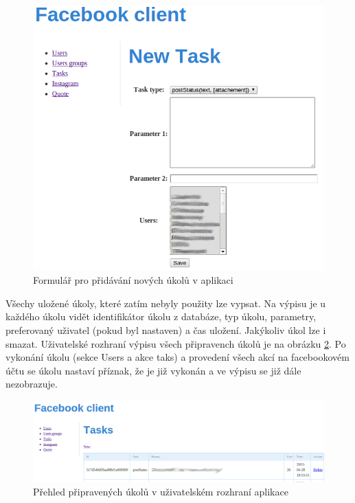 \documentclass[thesis=M,czech]{FITthesis}[2013/05/10]
\begin{document}
\begin{figure}[h]
\begin{center}
\includegraphics[width=5in]{figures/fcNewTask.png}
\caption{Formulář pro přidávání nových úkolů v aplikaci}
\label{fig:fcNewTask}
\end{center}
\end{figure}

Všechy uložené úkoly, které zatím nebyly použity lze vypsat. Na výpisu je u každého úkolu vidět identifikátor úkolu z databáze, typ úkolu, parametry, preferovaný uživatel (pokud byl nastaven) a čas uložení. Jakýkoliv úkol lze i smazat. Uživatelské rozhraní výpisu všech připravench úkolů je na obrázku \ref{fig:fcTasks}. Po vykonání úkolu (sekce Users a akce taks) a provedení všech akcí na facebookovém účtu se úkolu nastaví příznak, že je již vykonán a ve výpisu se již dále nezobrazuje.

\begin{figure}[h]
\begin{center}
\includegraphics[width=5in]{figures/fcTasks.png}
\caption{Přehled připravených úkolů v uživatelském rozhraní aplikace}
\label{fig:fcTasks}
\end{center}
\end{figure}
\end{document}
